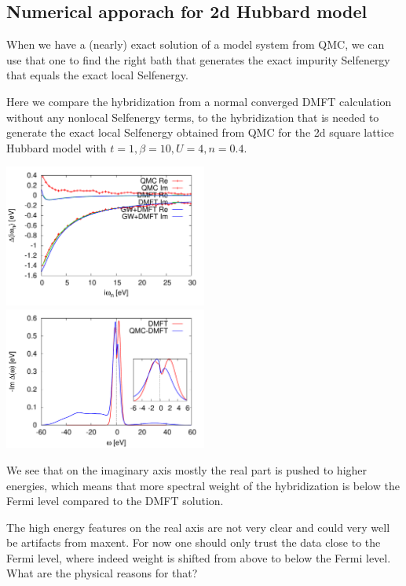 \documentclass[12pt,a4paper]{scrartcl}
\numberwithin{equation}{section}
\begin{document}


\subsection{Numerical apporach for 2d Hubbard model}
When we have a (nearly) exact solution of a model system  from QMC,
we can use that one to find the right bath that generates the exact
impurity Selfenergy that equals the exact local Selfenergy.

Here we compare the hybridization from a normal converged DMFT calculation without
any nonlocal Selfenergy terms, to the hybridization that is needed
to generate the exact local Selfenergy obtained from QMC for the 2d square lattice Hubbard model
with $t=1, \beta=10, U=4, n=0.4$.

\includegraphics[width=0.5\textwidth]{figs/reversebath/hybrid_imag.pdf}
\includegraphics[width=0.5\textwidth]{figs/reversebath/hybrid.pdf}

We see that on the imaginary axis mostly the real part is pushed to higher energies, which means
that more spectral weight of the hybridization is below the Fermi level compared
to the DMFT solution.

The high energy features on the real axis are not very clear and could very well be artifacts from maxent.
For now one should only trust the data close to the Fermi level, where
indeed weight is shifted from above to below the Fermi level.
What are the physical reasons for that?
\end{document}
